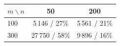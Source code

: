 \begin{tabular}{lcc}
\toprule
$m\backslash n$ & 50 & 200 \\
\midrule
100 & 5\,146 / 27\% & 5\,561 / 21\% \\
300 & 27\,750 / 58\% & 9\,896 / 16\% \\
\bottomrule
\end{tabular}